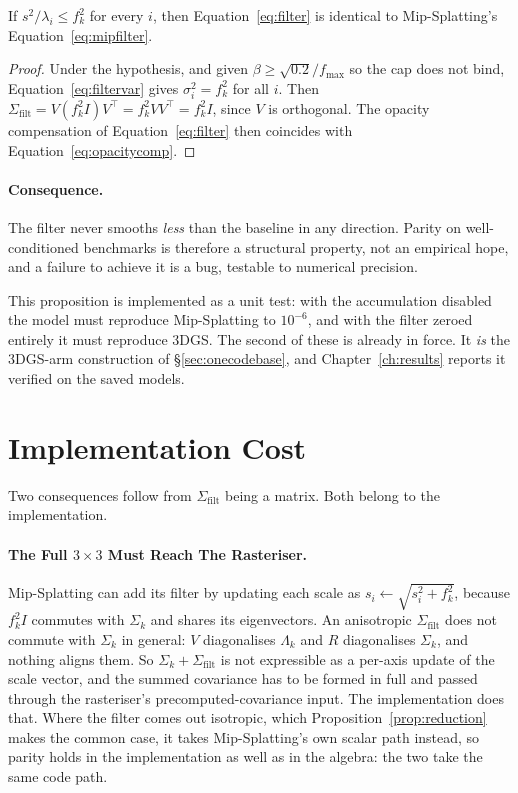 \begin{proposition}
\label{prop:reduction}
If $s^2/\lambda_i \le f_k^2$ for every $i$, then Equation~\eqref{eq:filter} is
identical to Mip-Splatting's Equation~\eqref{eq:mipfilter}.
\end{proposition}

\begin{proof}
Under the hypothesis, and given $\beta \ge \sqrt{0.2}/f_{\max}$ so the cap does
not bind, Equation~\eqref{eq:filtervar} gives $\sigma_i^2 = f_k^2$ for all $i$.
Then $\Sigma_{\mathrm{filt}} = V(f_k^2 I)V^{\!\top} = f_k^2 VV^{\!\top} = f_k^2 I$,
since $V$ is orthogonal. The opacity compensation of Equation~\eqref{eq:filter}
then coincides with Equation~\eqref{eq:opacitycomp}.
\end{proof}

\paragraph{Consequence.} The filter never smooths \emph{less} than the baseline
in any direction. Parity on well-conditioned benchmarks is therefore a
structural property, not an empirical hope, and a failure to achieve it is a
bug, testable to numerical precision.

This proposition is implemented as a unit test: with the accumulation disabled the model must reproduce Mip-Splatting to $10^{-6}$,
and with the filter zeroed entirely it must reproduce 3DGS. The second of these
is already in force. It \emph{is} the 3DGS-arm construction of \S\ref{sec:onecodebase}, and Chapter~\ref{ch:results} reports it verified on the saved models.

\section{Implementation Cost}
\label{sec:implcost}

Two consequences follow from $\Sigma_{\mathrm{filt}}$ being a matrix. Both belong to the implementation.

\paragraph{The Full $3\times3$ Must Reach The Rasteriser.} Mip-Splatting can add
its filter by updating each scale as $s_i \leftarrow \sqrt{s_i^2 + f_k^2}$,
because $f_k^2 I$ commutes with $\Sigma_k$ and shares its eigenvectors. An
anisotropic $\Sigma_{\mathrm{filt}}$ does not commute with $\Sigma_k$ in general:
$V$ diagonalises $\Lambda_k$ and $R$ diagonalises $\Sigma_k$, and nothing aligns
them. So $\Sigma_k + \Sigma_{\mathrm{filt}}$ is not expressible as a per-axis
update of the scale vector, and the summed covariance has to be formed in full
and passed through the rasteriser's precomputed-covariance input. The implementation does that. Where the filter comes out isotropic, which Proposition~\ref{prop:reduction}
makes the common case, it takes Mip-Splatting's own scalar path instead, so parity holds in the implementation as well as in the algebra: the two take
the same code path.

